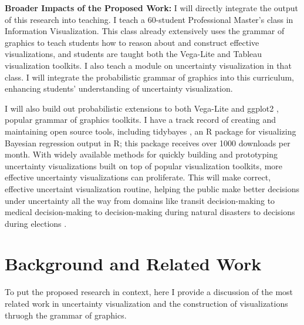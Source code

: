 \documentclass[11pt]{article}
\begin{document}
\textbf{Broader Impacts of the Proposed Work:} I will directly integrate the output of this research into teaching. I teach a 60-student Professional Master's class in Information Visualization. This class already extensively uses the grammar of graphics to teach students how to reason about and construct effective visualizations, and students are taught both the Vega-Lite \cite{Satyanarayan2017vegalite} and Tableau \cite{mackinlay2007show} visualization toolkits. I also teach a module on uncertainty visualization in that class. I will integrate the probabilistic grammar of graphics into this curriculum, enhancing students' understanding of uncertainty visualization.

I will also build out probabilistic extensions to both Vega-Lite \cite{Satyanarayan2017vegalite} and ggplot2 \cite{wickham2016ggplot2}, popular grammar of graphics toolkits. I have a track record of creating and maintaining open source tools, including tidybayes \cite{kay2017tidybayes}, an R package for visualizing Bayesian regression output in R; this package receives over 1000 downloads per month. With widely available methods for quickly building and prototyping uncertainty visualizations built on top of popular visualization toolkits, more effective uncertainty visualizations can proliferate. This will make correct, effective uncertaint visualization routine, helping the public make better decisions under uncertainty all the way from domains like transit decision-making \cite{kay2016bus,Fernandes2018} to medical decision-making \cite{Ancker2006} to decision-making during natural disasters \cite{Padilla2017ensemble, padilla2017effects, Cox2013hurricane, Mirzargar2014curve_boxplot} to decisions during elections \cite{gregor_aisch_live_2016}.



\section{Background and Related Work}

To put the proposed research in context, here I provide a discussion of the most related work in uncertainty visualization and the construction of visualizations thruogh the grammar of graphics.
\end{document}
